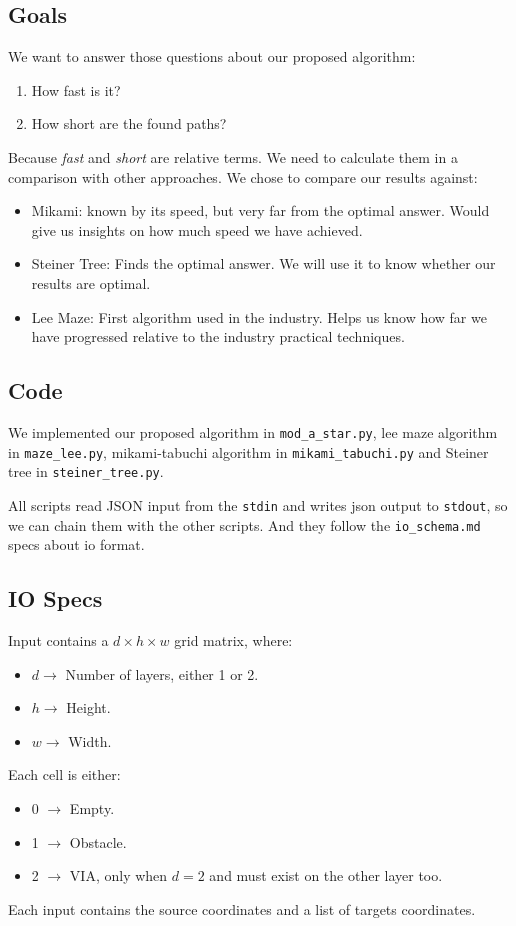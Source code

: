 \subsection{Goals}
We want to answer those questions about our proposed algorithm:
\begin{enumerate}
    \item How fast is it?
    \item How short are the found paths?
\end{enumerate}
Because \textit{fast} and \textit{short} are relative terms. We need to calculate them in a comparison with other approaches. 
We chose to compare our results against:
\begin{itemize}
    \item Mikami: known by its speed, but very far from the optimal answer. Would give us insights on how much speed we have achieved.
    \item Steiner Tree: Finds the optimal answer. We will use it to know whether our results are optimal.
    \item Lee Maze: First algorithm used in the industry. Helps us know how far we have progressed relative to the industry practical techniques.
\end{itemize}

\subsection{Code}
We implemented our proposed algorithm in \texttt{mod\_a\_star.py}, 
lee maze algorithm in \texttt{maze\_lee.py},
mikami-tabuchi algorithm in \texttt{mikami\_tabuchi.py}
and Steiner tree in \texttt{steiner\_tree.py}.

All scripts read JSON input from the \texttt{stdin} and writes json output to \texttt{stdout}, so we can chain them with the other scripts. And they follow the \texttt{io\_schema.md} specs about io format.

\subsection{IO Specs}
Input contains a $d\times h \times w$ grid matrix, where:
\begin{itemize}
    \item $d \rightarrow$ Number of layers, either 1 or 2.
    \item $h \rightarrow$ Height.
    \item $w \rightarrow$ Width.
\end{itemize}
Each cell is either:
\begin{itemize}
    \item 0 $\rightarrow$ Empty.
    \item 1 $\rightarrow$ Obstacle.
    \item 2 $\rightarrow$ VIA, only when $d=2$ and must exist on the other layer too.
\end{itemize}
Each input contains the source coordinates and a list of targets coordinates.

